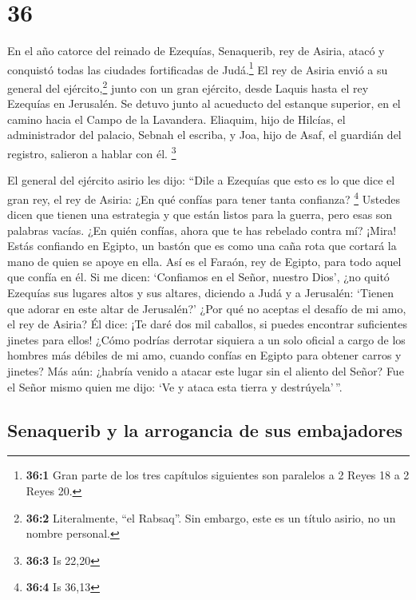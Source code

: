 \hypertarget{section-35}{%
\section{36}\label{section-35}}

 En el año catorce del reinado de Ezequías, Senaquerib,
rey de Asiria, atacó y conquistó todas las ciudades fortificadas de
Judá.\footnote{\textbf{36:1} Gran parte de los tres capítulos siguientes
  son paralelos a 2 Reyes 18 a 2 Reyes 20.}  El rey de
Asiria envió a su general del ejército,\footnote{\textbf{36:2}
  Literalmente, ``el Rabsaq''. Sin embargo, este es un título asirio, no
  un nombre personal.} junto con un gran ejército, desde Laquis hasta el
rey Ezequías en Jerusalén. Se detuvo junto al acueducto del estanque
superior, en el camino hacia el Campo de la Lavandera. 
Eliaquim, hijo de Hilcías, el administrador del palacio, Sebnah el
escriba, y Joa, hijo de Asaf, el guardián del registro, salieron a
hablar con él. \footnote{\textbf{36:3} Is 22,20}

 El general del ejército asirio les dijo: ``Dile a
Ezequías que esto es lo que dice el gran rey, el rey de Asiria: ¿En qué
confías para tener tanta confianza? \footnote{\textbf{36:4} Is 36,13}
 Ustedes dicen que tienen una estrategia y que están
listos para la guerra, pero esas son palabras vacías. ¿En quién confías,
ahora que te has rebelado contra mí?  ¡Mira! Estás
confiando en Egipto, un bastón que es como una caña rota que cortará la
mano de quien se apoye en ella. Así es el Faraón, rey de Egipto, para
todo aquel que confía en él.  Si me dicen: `Confiamos en
el Señor, nuestro Dios', ¿no quitó Ezequías sus lugares altos y sus
altares, diciendo a Judá y a Jerusalén: `Tienen que adorar en este altar
de Jerusalén?'  ¿Por qué no aceptas el desafío de mi amo,
el rey de Asiria? Él dice: ¡Te daré dos mil caballos, si puedes
encontrar suficientes jinetes para ellos!  ¿Cómo podrías
derrotar siquiera a un solo oficial a cargo de los hombres más débiles
de mi amo, cuando confías en Egipto para obtener carros y jinetes?
 Más aún: ¿habría venido a atacar este lugar sin el
aliento del Señor? Fue el Señor mismo quien me dijo: `Ve y ataca esta
tierra y destrúyela'\,''.

\hypertarget{senaquerib-y-la-arrogancia-de-sus-embajadores}{%
\subsection{Senaquerib y la arrogancia de sus
embajadores}\label{senaquerib-y-la-arrogancia-de-sus-embajadores}}

